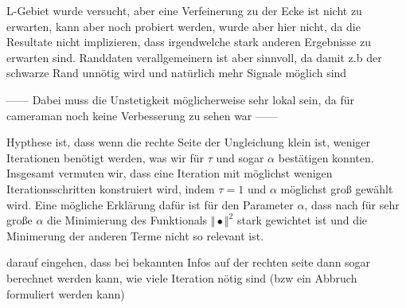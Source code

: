 \medskip

L-Gebiet wurde versucht, aber eine Verfeinerung zu der Ecke ist nicht zu erwarten,
kann aber noch probiert werden, wurde aber hier nicht, da die Resultate nicht 
implizieren, dass irgendwelche stark anderen Ergebnisse zu erwarten sind.
Randdaten verallgemeinern ist aber sinnvoll, da damit z.b der schwarze Rand
unnötig wird und natürlich mehr Signale möglich sind

------
Dabei muss die Unstetigkeit möglicherweise sehr lokal sein, da für
cameraman noch keine Verbesserung zu sehen war
------

Hypthese ist, dass wenn die rechte Seite der Ungleichung klein ist, weniger
Iterationen benötigt werden, was wir für $\tau$ und sogar $\alpha$ 
bestätigen konnten.
Insgesamt vermuten wir, dass eine Iteration mit möglichst wenigen
Iterationsschritten konstruiert wird, indem $\tau=1$ und $\alpha$ möglichst
groß gewählt wird.
Eine mögliche Erklärung dafür ist für den Parameter $\alpha$, dass
nach  für sehr große $\alpha$ die Minimierung
des Funktionals $\Vert\bullet\Vert^2$ stark gewichtet ist und die 
Minimerung der anderen Terme nicht so relevant ist.

darauf eingehen, dass bei bekannten Infos auf der rechten seite dann sogar
berechnet werden kann, wie viele Iteration nötig sind (bzw ein Abbruch 
formuliert werden kann)
